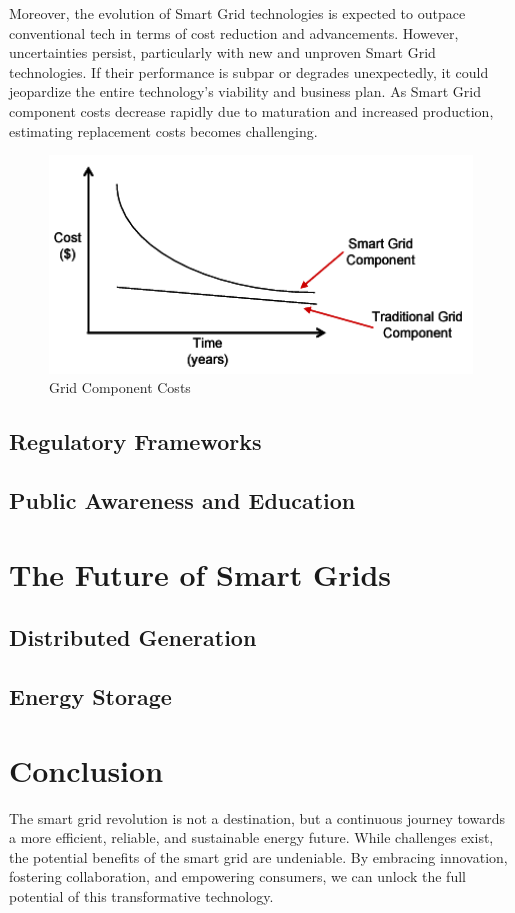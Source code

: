 Moreover, the evolution of Smart Grid technologies is expected to outpace conventional tech in terms of cost reduction and advancements. However, uncertainties persist, particularly with new and unproven Smart Grid technologies. If their performance is subpar or degrades unexpectedly, it could jeopardize the entire technology's viability and business plan. As Smart Grid component costs decrease rapidly due to maturation and increased production, estimating replacement costs becomes challenging\cite{smartgrid}.
\begin{figure}[h]
	\centering
	\includegraphics[width=12cm]{figures/cost.PNG}
	\caption{Grid Component Costs \cite{smartgrid}}
	\label{fig:costs}
\end{figure}
\subsection{Regulatory Frameworks}
\subsection{Public Awareness and Education}
\section{The Future of Smart Grids }  
\subsection{Distributed Generation}
\subsection{Energy Storage}
\newpage
\section*{Conclusion}
The smart grid revolution is not a destination, but a continuous journey towards a more efficient, reliable, and sustainable energy future. While challenges exist, the potential benefits of the smart grid are undeniable. By embracing innovation, fostering collaboration, and empowering consumers, we can unlock the full potential of this transformative technology.

